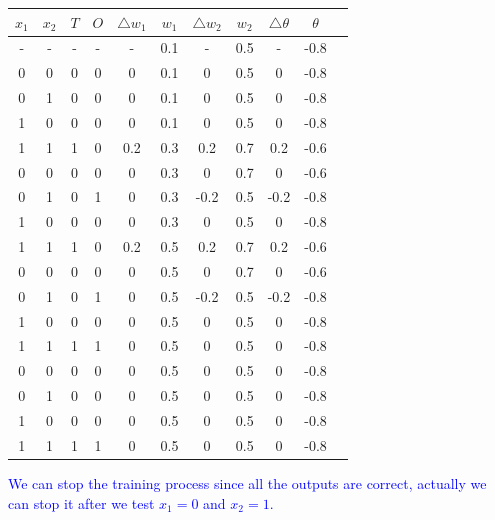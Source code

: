 \documentclass{book}
\begin{document}
\begin{center}
    \begin{tabular}{|c|c|c|c|c|c|c|c|c|c|c|}
        \hline
        \rowcolor{lightblue}
        \textbf{\(x_1\)} & \textbf{\(x_2\)} & \textbf{\(T\)} & \textbf{\(O\)} & \textbf{\(\triangle w_1\)} & \textbf{\(w_1\)} & \textbf{\(\triangle w_2\)} & \textbf{\(w_2\)} & \textbf{\(\triangle \theta\)} & \textbf{\(\theta\)}\\
        \hline
        - & - & - & - & - & 0.1 & - & 0.5 & - & -0.8\\
        \hline
        0 & 0 & 0 & 0 & 0 & 0.1 & 0 & 0.5 & 0 & -0.8\\
        \hline
        0 & 1 & 0 & 0 & 0 & 0.1 & 0 & 0.5 & 0 & -0.8\\
        \hline
        1 & 0 & 0 & 0 & 0 & 0.1 & 0 & 0.5 & 0 & -0.8\\
        \hline
        \rowcolor{lightyellow}
        1 & 1 & 1 & 0 & 0.2 & 0.3 & 0.2 & 0.7 & 0.2 & -0.6\\
        \hline
        0 & 0 & 0 & 0 & 0 & 0.3 & 0 & 0.7 & 0 & -0.6\\
        \hline
        \rowcolor{lightyellow}
        0 & 1 & 0 & 1 & 0 & 0.3 & -0.2 & 0.5 & -0.2 & -0.8\\
        \hline
        1 & 0 & 0 & 0 & 0 & 0.3 & 0 & 0.5 & 0 & -0.8\\
        \hline
        \rowcolor{lightyellow}
        1 & 1 & 1 & 0 & 0.2 & 0.5 & 0.2 & 0.7 & 0.2 & -0.6\\
        \hline
        0 & 0 & 0 & 0 & 0 & 0.5 & 0 & 0.7 & 0 & -0.6\\
        \hline
        \rowcolor{lightyellow}
        0 & 1 & 0 & 1 & 0 & 0.5 & -0.2 & 0.5 & -0.2 & -0.8\\
        \hline
        1 & 0 & 0 & 0 & 0 & 0.5 & 0 & 0.5 & 0 & -0.8\\
        \hline
        1 & 1 & 1 & 1 & 0 & 0.5 & 0 & 0.5 & 0 & -0.8\\
        \hline
        0 & 0 & 0 & 0 & 0 & 0.5 & 0 & 0.5 & 0 & -0.8\\
        \hline
        0 & 1 & 0 & 0 & 0 & 0.5 & 0 & 0.5 & 0 & -0.8\\
        \hline
        1 & 0 & 0 & 0 & 0 & 0.5 & 0 & 0.5 & 0 & -0.8\\
        \hline
        1 & 1 & 1 & 1 & 0 & 0.5 & 0 & 0.5 & 0 & -0.8\\
        \hline
    \end{tabular}
\end{center}
\textcolor{blue}{We can stop the training process since all the outputs are correct, actually we can stop it after we test $x_1 = 0$ and $x_2 = 1$.}\\
\end{document}
